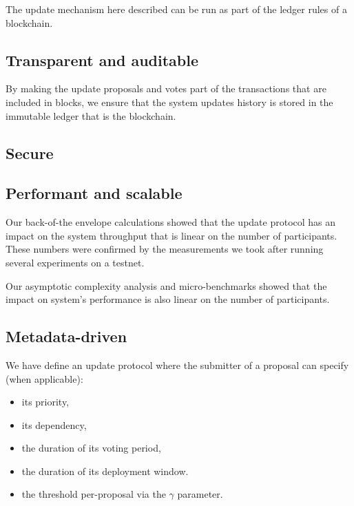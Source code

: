\documentclass[11pt,a4paper]{article}
\begin{document}
The update mechanism here described can be run as part of the ledger rules of a
blockchain.

\subsection{Transparent and auditable}
\label{sec:sat-transp-audit}

By making the update proposals and votes part of the transactions that are
included in blocks, we ensure that the system updates history is stored in the
immutable ledger that is the blockchain.

\subsection{Secure}
\label{sec:sat-secure}

%
%
%

\subsection{Performant and scalable}
\label{sec:sat-performant-scalable}

Our back-of-the envelope calculations showed that the update protocol has an
impact on the system throughput that is linear on the number of participants.
These numbers were confirmed by the measurements we took after running several
experiments on a testnet.

Our asymptotic complexity analysis and micro-benchmarks showed that the impact
on system's performance is also linear on the number of participants.

\subsection{Metadata-driven}
\label{sec:sat-metadata-driven}

We have define an update protocol where the submitter of a proposal can specify
(when applicable):
\begin{itemize}
\item its priority,
\item its dependency,
\item the duration of its voting period,
\item the duration of its deployment window.
\item the threshold per-proposal via the $\gamma$ parameter.
\end{itemize}
\end{document}
